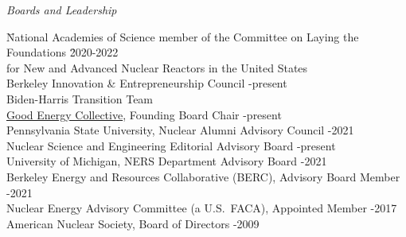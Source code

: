 \vspace*{-.25em}
\textit{Boards and Leadership}
\vspace*{-.4em}
\begin{tabbing}
\hspace*{1 em}\= National Academies of Science member of the Committee on Laying the
Foundations \hspace*{0.5em} \= 2020-2022\\
\> \hspace*{1em} for New and Advanced Nuclear Reactors in the United States\\
\> Berkeley Innovation \& Entrepreneurship Council -present\\
\> Biden-Harris Transition Team \\
%
\> \href{https://www.goodenergycollective.org/}{Good Energy Collective}, Founding Board Chair -present\\
%
\> Pennsylvania State University, Nuclear Alumni Advisory Council -2021\\
%
\> Nuclear Science and Engineering Editorial Advisory Board -present\\
%
\> University of Michigan, NERS Department Advisory Board -2021\\
%
\> Berkeley Energy and Resources Collaborative (BERC), Advisory Board Member -2021\\
%
%
\> Nuclear Energy Advisory Committee (a U.S.\ FACA), Appointed Member -2017 \\
%
%
%
\> American  Nuclear Society, Board of Directors -2009
\end{tabbing}

